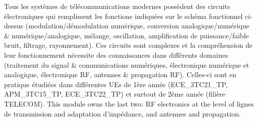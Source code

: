 \begin{remark}
  Tous les systèmes de télécommunications modernes possèdent des circuits
  électroniques qui remplissent les fonctions indiquées sur le schéma
  fonctionnel ci-dessus (modulation/démodulation numérique, conversion
  analogique/numérique \& numérique/analogique, mélange, oscillation,
  amplification de puissance/faible bruit, filtrage, rayonnement). Ces
  circuits sont complexes et la compréhension de leur fonctionnement
  nécessite des connaissances dans différents domaines (traitement du signal
  \& communications numériques, électronique numérique et analogique,
  électronique RF, antennes \& propagation RF). Celles-ci sont en pratique
  étudiées dans différentes UEs de 1ère année (ECE\_3TC21\_TP, APM\_3TC15\_TP,
  ECE\_3TC22\_TP) et surtout de 2ème année (filière TELECOM). This module owns
  the last two: RF electronics at the level of lignes de transmission and
  adaptation d'impédance, and antennes and propagation.
\end{remark}
